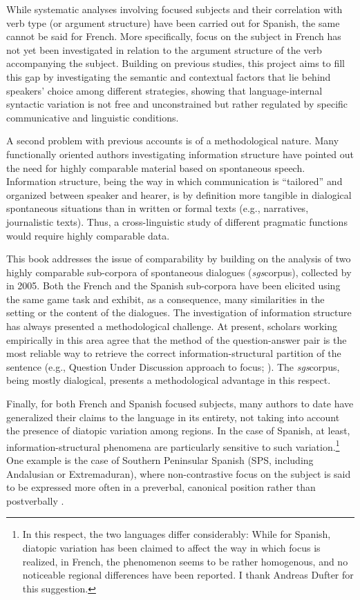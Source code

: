  While systematic analyses involving focused subjects and their correlation with verb type (or argument structure) have been carried out for Spanish, the same cannot be said for French. More specifically, focus on the subject in French has not yet been investigated in relation to the argument structure of the verb accompanying the subject. 
Building on previous studies, this project aims to fill this gap by investigating the semantic and contextual factors that lie behind speakers' choice among different strategies, showing that language-internal syntactic variation is not free and unconstrained but rather regulated by specific communicative and linguistic conditions.

A second problem with previous accounts is of a methodological nature. Many functionally oriented authors investigating information structure have pointed out the need for highly comparable material based on spontaneous speech. Information structure, being the way in which communication is ``tailored” \parencite{prince1981towards} and organized between speaker and hearer, is by definition more tangible in dialogical spontaneous situations than in written or formal texts (e.g., narratives, journalistic texts). Thus, a cross-linguistic study of different pragmatic functions would require highly comparable data. 

This book addresses the issue of comparability by building on the analysis of two highly comparable sub-corpora of spontaneous dialogues (\textit{sgs}corpus), collected by \textcite{adli2011gradient} in 2005. Both the French and the Spanish sub-corpora have been elicited using the same game task and exhibit, as a consequence, many similarities in the setting or the content of the dialogues. The investigation of information structure has always presented a methodological challenge. At present, scholars working empirically in this area agree that the method of the question-answer pair is the most reliable way to retrieve the correct information-structural partition of the sentence (e.g., Question Under Discussion approach to focus; \cite{roberts1996information, riester2018annotation, riester2019constructing}). The \textit{sgs}corpus, being mostly dialogical, presents a methodological advantage in this respect.

Finally, for both French and Spanish focused subjects, many authors to date have generalized their claims to the language in its entirety, not taking into account the presence of diatopic variation among regions. In the case of Spanish, at least, information-structural phenomena are particularly sensitive to such variation.\footnote{In this respect, the two languages differ considerably: While for Spanish, diatopic variation has been claimed to affect the way in which focus is realized, in French, the phenomenon seems to be rather homogenous, and no noticeable regional differences have been reported. I thank Andreas Dufter for this suggestion.} One example is the case of Southern Peninsular Spanish (SPS, including Andalusian or Extremaduran), where non-contrastive focus on the subject is said to be expressed more often in a preverbal, canonical position rather than postverbally \parencite{jimenez2015focus}. 

